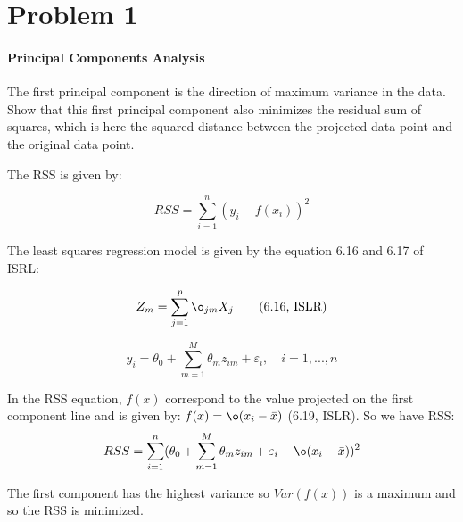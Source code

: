 \section*{Problem 1}

\paragraph{Principal Components Analysis}
The first principal component is the direction of maximum variance in the data. Show that this first principal component also minimizes the residual sum of squares, which is here the squared distance between the projected data point and the original data point.

The RSS is given by: 

\[ RSS = \sum_{i = 1}^{n}(y_i - f(x_i))^2 \]

The least squares regression model is given by the equation 6.16 and 6.17 of ISRL: 

\[ 
	Z_m = \sum_{j = 1}^{p}\o_{jm} X_j \tag{6.16, ISLR} \label{6.16}
 \]

\[ 
	y_i = \theta_0 + \sum_{m = 1}^{M} \theta_m z_{im} + \varepsilon_i,\quad i = 1,...,n \tag{6.17, ISLR} \label{6.17} 
\]

In the RSS equation, $f(x)$ correspond to the value projected on the first component line and is given by: $f(x) = \o(x_i - \bar{x})$ (6.19, ISLR). 
So we have RSS:  
\[ 
	RSS = \sum_{i = 1}^{n}(\theta_0 + \sum_{m = 1}^{M} \theta_m z_{im} + \varepsilon_i - \o(x_i - \bar{x}))^2
 \]
 
 
 The first component has the highest variance so $Var(f(x))$ is a maximum and so the RSS is minimized. 

